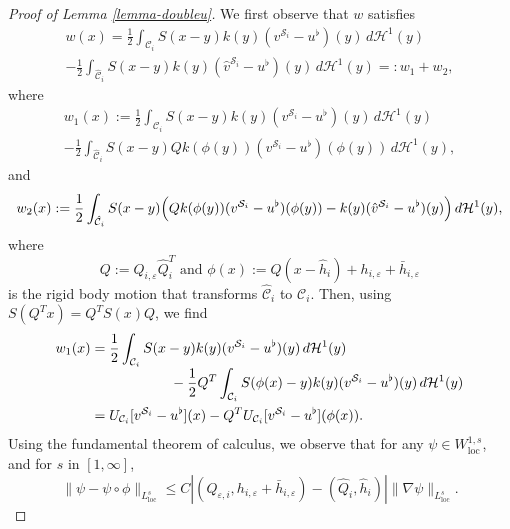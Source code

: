 \documentclass[JEP,XML,SOM,Unicode, NoEqCountersInSection,NoFloatCountersInSection,published]{cedram}
\let\eps\varepsilon
\newcommand{\dd}{\,d}
\newcommand{\loc}{\mathrm{loc}}
\theoremstyle{definition}
\theoremstyle{remark}
\begin{document}
\begin{proof}[Proof of Lemma \ref{lemma-doubleu}]
We first observe that $w$ satisfies\vspace*{-3pt}
\begin{multline*}
w(x) = \frac12\int_{\mathcal C_i} S(x-y) k(y) (v^{{\mathcal S}_i} - u^\flat)(y) \dd \mathcal H^1(y)
\\[-5pt]
- \frac12 \int_{\hat {\mathcal C}_i} S(x-y) k(y) (\hat v^{{\mathcal S}_i} - u^\flat)(y) \dd \mathcal H^1(y) =: w_1 + w_2,
\end{multline*}
where\vspace*{-3pt}
\begin{multline*}
w_1 (x):= \frac12 \int_{\mathcal C_i} S(x-y) k(y) (v^{{\mathcal S}_i} - u^\flat)(y) \dd \mathcal H^1(y) \\[-5pt]
- \frac12 \int_{\hat {\mathcal C}_i} S(x-y) Q k(\phi(y)) (v^{{\mathcal S}_i} - u^\flat)(\phi(y)) \dd \mathcal H^1(y),
\end{multline*}
and\vspace*{-3pt}
\begin{equation*}
w_2 (x) := \frac12 \int_{\hat {\mathcal C}_i} S(x-y) \Bigl(Q k(\phi(y)) (v^{{\mathcal S}_i} - u^\flat)(\phi(y)) - k(y)(\hat v^{{\mathcal S}_i} - u^\flat)(y) \Bigr) \dd \mathcal H^1(y),
\end{equation*}
where\vspace*{-3pt}
\[
Q:=Q_{i,\eps} \hat Q_{i}^T
\text{ and } \phi(x) := Q (x - \hat h_i) + h_{i,\eps} + \bar h_{i,\eps}
\]
is the rigid body motion that transforms $\hat {\mathcal C}_i$ to ${\mathcal C}_i$.
Then, using $S(Q^Tx) = Q^T S(x) Q$, we find\vspace*{-3pt}
\begin{align*}
w_1(x) &= \frac12 \int_{\mathcal C_i} S(x-y) k(y) (v^{{\mathcal S}_i} - u^\flat)(y) \dd \mathcal H^1(y) \\[-3pt]
&\hspace*{2cm} - \frac12 Q^T \int_{\mathcal C_i} S(\phi(x)-y) k(y) (v^{{\mathcal S}_i} - u^\flat)(y) \dd \mathcal H^1(y) \\
&= U_{\mathcal C_i}[v^{{\mathcal S}_i} - u^\flat](x)- Q^T U_{\mathcal C_i}[v^{{\mathcal S}_i} - u^\flat](\phi(x)).
\end{align*}
Using the fundamental theorem of calculus, we observe that for any $\psi \in W^{1,s}_\loc$, and for $s$ in $[1,\infty]$,\vspace*{-3pt}
\begin{equation} \label{est:Poincare.psi}
\|\psi - \psi \circ \phi\|_{L^s_\loc} \leq C |(Q_{\eps,i},h_{i,\eps} + \bar h_{i,\eps}) - (\hat Q_i,\hat h_i)| \|\nabla \psi\|_{L^s_\loc}.

\end{equation}
\end{proof}
\end{document}
